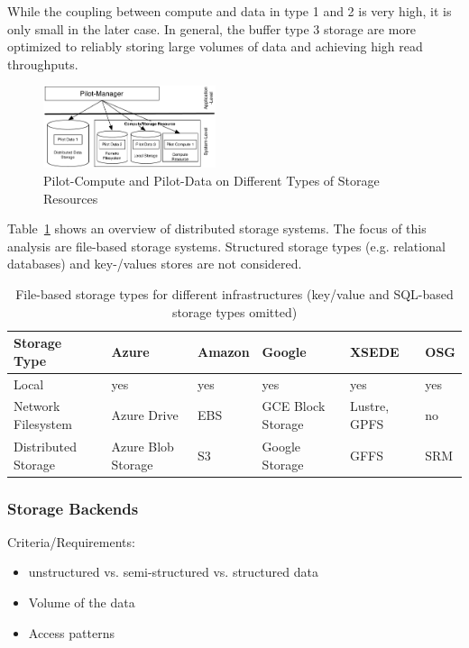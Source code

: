 \documentclass[conference]{IEEEtran}
\begin{document}
While the coupling between compute and data in type 1 and 2 is very high, it 
is only small in the later case. In general, the buffer type 3 storage are 
more optimized to reliably storing large volumes of data and achieving high
read throughputs.


\begin{figure}[t]
	\centering
		\includegraphics[width=0.45\textwidth]{figures/storage-types.pdf}
	\caption{Pilot-Compute and Pilot-Data on Different Types of Storage Resources}
	\label{fig:figures_storage-types}
\end{figure}



Table~\ref{tab:storage-systems} shows an overview of distributed storage 
systems. The focus of this analysis are file-based storage systems. Structured
storage types (e.g. relational databases) and key-/values stores are not 
considered.

\begin{table}[t]
\begin{tabular}{|p{1.3cm}|p{1cm}|p{1cm}|p{1cm}|p{1cm}|p{1cm}|}
	\hline
	\textbf{Storage Type} &\textbf{Azure} &\textbf{Amazon} &\textbf{Google} &\textbf{XSEDE}  &\textbf{OSG} \\
	\hline
	Local	&yes &yes &yes &yes &yes\\
	\hline
	Network Filesystem &Azure Drive &EBS &GCE Block Storage &Lustre, GPFS 
	&no\\
	\hline
	Distributed Storage &Azure Blob Storage &S3 &Google Storage &GFFS
	 &SRM\\
	\hline	
\end{tabular}
\caption{File-based storage types for different infrastructures (key/value and 
SQL-based storage types omitted) \label{tab:storage-systems}}
\end{table}


\subsubsection*{Storage Backends}

Criteria/Requirements:
\begin{itemize}
	\item unstructured vs. semi-structured vs. structured data
	\item Volume of the data
	\item Access patterns
\end{itemize}
\end{document}
